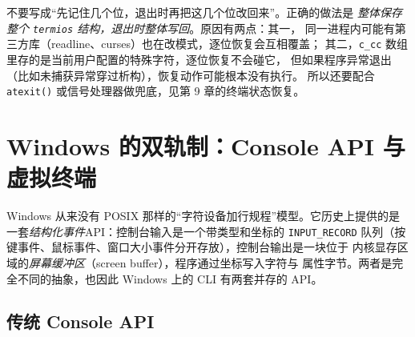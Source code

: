 \documentclass[12pt,a4paper,fontset=fandol]{ctexbook}
\newcommand{\Fn}[1]{\texttt{#1()}}
\newcommand{\Tp}[1]{\texttt{#1}}
\begin{document}
\begin{warning}[title={把 \Tp{termios} 结构体直接整体保存}]
不要写成``先记住几个位，退出时再把这几个位改回来''。正确的做法是
\emph{整体保存整个 \Tp{termios} 结构，退出时整体写回}。原因有两点：其一，
同一进程内可能有第三方库（readline、curses）也在改模式，逐位恢复会互相覆盖；
其二，\Tp{c\_cc} 数组里存的是当前用户配置的特殊字符，逐位恢复不会碰它，
但如果程序异常退出（比如未捕获异常穿过析构），恢复动作可能根本没有执行。
所以还要配合 \Fn{atexit} 或信号处理器做兜底，见第 9 章的终端状态恢复。
\end{warning}

\section{Windows 的双轨制：Console API 与虚拟终端}

Windows 从来没有 POSIX 那样的``字符设备加行规程''模型。它历史上提供的是
一套\emph{结构化事件}API：控制台输入是一个带类型和坐标的 \Tp{INPUT\_RECORD}
队列（按键事件、鼠标事件、窗口大小事件分开存放），控制台输出是一块位于
内核显存区域的\emph{屏幕缓冲区}（screen buffer），程序通过坐标写入字符与
属性字节。两者是完全不同的抽象，也因此 Windows 上的 CLI 有两套并存的 API。

\subsection{传统 Console API}
\end{document}
